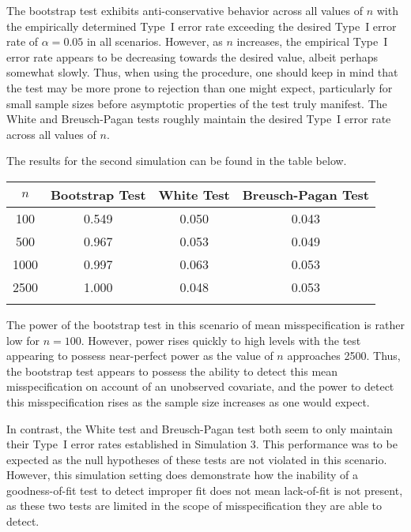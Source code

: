\documentclass[12pt]{article} %
\theoremstyle{definition}
\begin{document}
The bootstrap test exhibits anti-conservative behavior across all values of $n$ with the empirically determined Type~I error rate exceeding the desired Type~I error rate
of $\alpha = 0.05$ in all scenarios. However, as $n$ increases, the empirical Type~I error rate appears to be decreasing towards the desired value, albeit perhaps somewhat slowly. Thus, when
using the procedure, one should keep in mind that the test may be more prone to
rejection than one might expect, particularly for small sample sizes before asymptotic properties of the test truly manifest. The White and Breusch-Pagan tests roughly maintain
the desired Type~I error rate across all values of $n$.

The results for the second simulation can be found in the table below.

\begin{table}[H]
	\centering
	\small\addtolength{\tabcolsep}{-3pt}
	\setlength\extrarowheight{-3pt}
	{
	\begin{tabular}{ c|c|c|c}
	$n$ & Bootstrap Test & White Test & Breusch-Pagan Test \\
	 \hline
	 100 & 0.549 & 0.050 & 0.043 \\
	 500 & 0.967 & 0.053 & 0.049 \\
	 1000 & 0.997 & 0.063 & 0.053 \\
	 2500 & 1.000 & 0.048 & 0.053 \\
	 \Xhline{3\arrayrulewidth}
	\end{tabular}
	}
\end{table}

The power of the bootstrap test in this scenario of mean misspecification is rather low for $n = 100$. However, power rises quickly to high levels
with the test appearing to possess near-perfect power as the value of $n$ approaches 2500. Thus, the bootstrap test appears to possess the ability to detect this mean
misspecification on account of an unobserved covariate, and the power to detect this misspecification rises as the sample size increases as one would expect.

In contrast, the White test and Breusch-Pagan test both seem to only maintain their Type~I error rates established in Simulation 3. This performance was to be expected
as the null hypotheses of these tests are not violated in this scenario. However, this simulation setting does demonstrate how the inability of a goodness-of-fit test to detect improper
fit does not mean lack-of-fit is not present, as these two tests are limited in the scope of misspecification they are able to detect.
\end{document}
